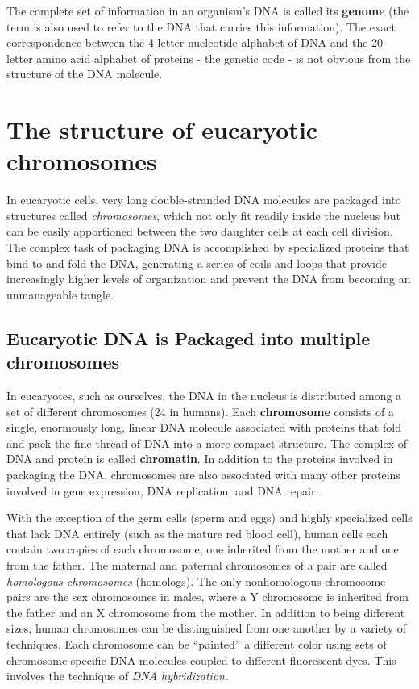 The complete set of information in an organism’s DNA is called its \textbf{genome}
(the term is also used to refer to the DNA that carries this information).
The exact correspondence between the 4-letter nucleotide alphabet
of DNA and the 20-letter amino acid alphabet of proteins - the genetic
code - is not obvious from the structure of the DNA molecule.

\section{The structure of eucaryotic chromosomes}

In eucaryotic cells, very long double-stranded DNA molecules are packaged
into structures called \textit{chromosomes}, which not only fit readily inside the
nucleus but can be easily apportioned between the two daughter cells at
each cell division. The complex task of packaging DNA is accomplished
by specialized proteins that bind to and fold the DNA, generating a series
of coils and loops that provide increasingly higher levels of organization
and prevent the DNA from becoming an unmanageable tangle.

\subsection{Eucaryotic DNA is Packaged into multiple chromosomes}

In eucaryotes, such as ourselves, the DNA in the nucleus is distributed
among a set of different chromosomes (24 in humans).
Each \textbf{chromosome} consists of a single, enormously long,
linear DNA molecule associated with proteins that fold and pack the fine
thread of DNA into a more compact structure. The complex of DNA and
protein is called \textbf{chromatin}. In addition to the proteins involved in packaging
the DNA, chromosomes are also associated with many other proteins
involved in gene expression, DNA replication, and DNA repair.

With the exception of the germ cells (sperm and eggs) and highly specialized
cells that lack DNA entirely (such as the mature red blood cell),
human cells each contain two copies of each chromosome, one inherited
from the mother and one from the father. The maternal and paternal
chromosomes of a pair are called \textit{homologous chromosomes} (homologs).
The only nonhomologous chromosome pairs are the sex chromosomes
in males, where a Y chromosome is inherited from the father and an X
chromosome from the mother.
In addition to being different sizes, human chromosomes can be distinguished
from one another by a variety of techniques. Each chromosome
can be “painted” a different color using sets of chromosome-specific
DNA molecules coupled to different fluorescent dyes. This
involves the technique of \textit{DNA hybridization}.

